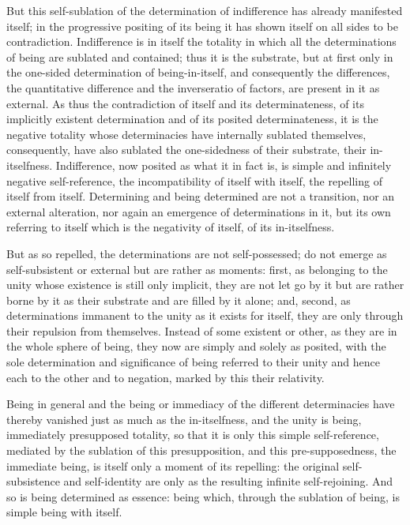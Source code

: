 But this self-sublation of the determination of
indifference has already manifested itself;
in the progressive positing of its being
it has shown itself on all sides to be contradiction.
Indifference is in itself the totality
in which all the determinations of being are sublated and contained;
thus it is the substrate,
but at first only in the one-sided determination of being-in-itself,
and consequently the differences,
the quantitative difference and the inverseratio of factors,
are present in it as external.
As thus the contradiction of itself and its determinateness,
of its implicitly existent determination
and of its posited determinateness,
it is the negative totality whose determinacies
have internally sublated themselves,
consequently, have also sublated the one-sidedness
of their substrate, their in-itselfness.
Indifference, now posited as what it in fact is,
is simple and infinitely negative self-reference,
the incompatibility of itself with itself,
the repelling of itself from itself.
Determining and being determined are
not a transition,
nor an external alteration,
nor again an emergence of determinations in it,
but its own referring to itself
which is the negativity of itself,
of its in-itselfness.

But as so repelled,
the determinations are not self-possessed;
do not emerge as self-subsistent or external
but are rather as moments:
first, as belonging to the unity
whose existence is still only implicit,
they are not let go by it but are rather borne by it
as their substrate and are filled by it alone;
and, second, as determinations immanent
to the unity as it exists for itself,
they are only through their repulsion from themselves.
Instead of some existent or other,
as they are in the whole sphere of being,
they now are simply and solely as posited,
with the sole determination and significance of
being referred to their unity
and hence each to the other and to negation,
marked by this their relativity.

Being in general and the being or immediacy
of the different determinacies have thereby vanished
just as much as the in-itselfness,
and the unity is being,
immediately presupposed totality,
so that it is only this simple self-reference,
mediated by the sublation of this presupposition,
and this pre-supposedness, the immediate being,
is itself only a moment of its repelling:
the original self-subsistence and self-identity are only
as the resulting infinite self-rejoining.
And so is being determined as essence:
being which, through the sublation of being,
is simple being with itself.
